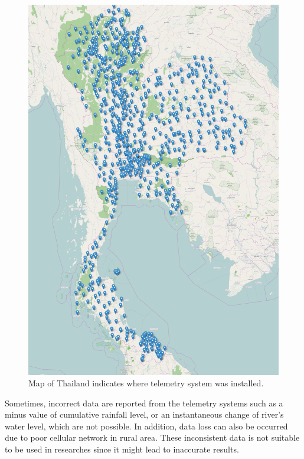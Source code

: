 \documentclass[conference]{IEEEtran}
\begin{document}
\begin{figure}
  \includegraphics[width=\linewidth]{map.png}
  \caption{Map of Thailand indicates where telemetry system was installed.}
  \label{fig:tele_station_map}
\end{figure}

Sometimes, incorrect data are reported from the telemetry systems such as a minus value of cumulative rainfall level, or an instantaneous change of river's water level, which are not possible. In addition, data loss can also be occurred due to poor cellular network in rural area. These inconsistent data is not suitable to be used in researches since it might lead to inaccurate results.
\end{document}
